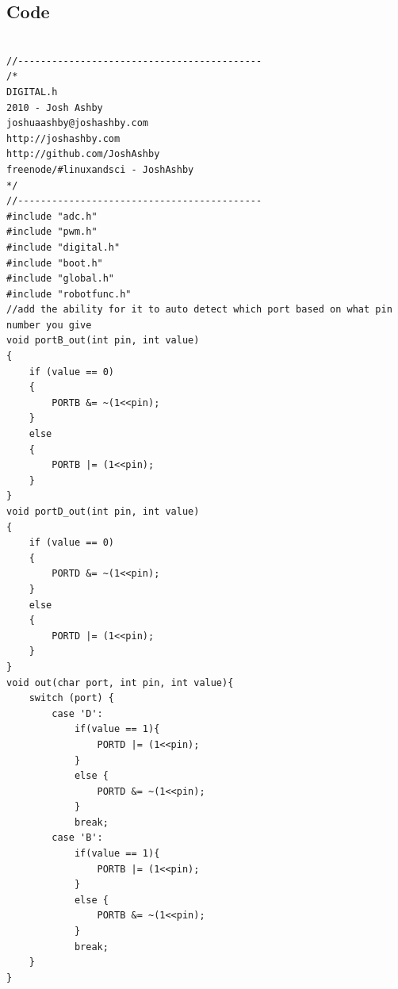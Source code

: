 \documentclass{article}
\begin{document}
\subsection{Code}
\lstset{language=C}
\lstset{numbers=left, numberstyle=\small, stepnumber=1, numbersep=5pt}
\begin{lstlisting}[caption={The digital function library.},label=digital,frame=tbl]

//-------------------------------------------
/*
DIGITAL.h
2010 - Josh Ashby
joshuaashby@joshashby.com
http://joshashby.com
http://github.com/JoshAshby
freenode/#linuxandsci - JoshAshby
*/
//-------------------------------------------
#include "adc.h"
#include "pwm.h"
#include "digital.h"
#include "boot.h"
#include "global.h"
#include "robotfunc.h"
//add the ability for it to auto detect which port based on what pin number you give
void portB_out(int pin, int value)
{
    if (value == 0)
    {
        PORTB &= ~(1<<pin);
    }
    else
    {
        PORTB |= (1<<pin);
    }
}
void portD_out(int pin, int value)
{
    if (value == 0)
    {
        PORTD &= ~(1<<pin);
    }
    else
    {
        PORTD |= (1<<pin);
    }
}
void out(char port, int pin, int value){
    switch (port) {
        case 'D':
            if(value == 1){
                PORTD |= (1<<pin);
            }
            else {
                PORTD &= ~(1<<pin);
            }
            break;
        case 'B':
            if(value == 1){
                PORTB |= (1<<pin);
            }
            else {
                PORTB &= ~(1<<pin);
            }
            break;
    }
}


\end{lstlisting}
\end{document}
